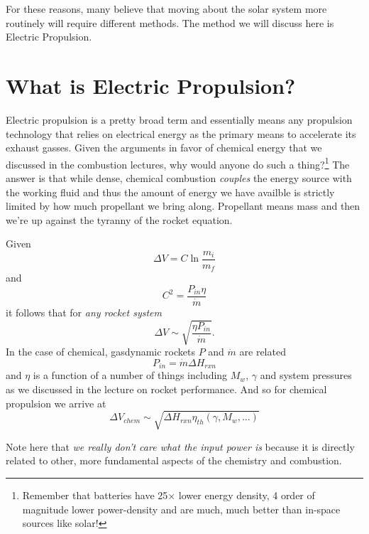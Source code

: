 \documentclass[twocolumn]{memoir} %
\begin{document}
For these reasons, many believe that moving about the solar system more routinely will require
different methods.  The method we will discuss here is Electric Propulsion.

\section{What is Electric Propulsion?}
Electric propulsion is a pretty broad term and essentially means any propulsion technology that
relies on electrical energy as the primary means to accelerate its exhaust gasses.  Given the
arguments in favor of chemical energy that we discussed in the combustion lectures, why would
anyone do such a thing?\footnote{Remember that batteries have 25$\times$ lower energy density,
4 order of magnitude lower power-density and are much, much better than in-space sources
like solar!}  The answer is that while dense, chemical combustion \emph{couples} the energy
source with the working fluid and thus the amount of energy we have availble is strictly
limited by how much propellant we bring along.  Propellant means mass and then we're up against
the tyranny of the rocket equation.  

Given
\begin{equation*}
    \Delta V = C \ln\frac{m_i}{m_f}
\end{equation*}
%
and
\begin{equation*}
    C^2 = \frac{P_{in}\eta}{\dot{m}}
\end{equation*}
%
it follows that for \emph{any rocket system}
%
\begin{equation}
    \Delta V \sim \sqrt{\frac{\eta P_{in}}{\dot{m}}}.
    \label{eq:delV_P_dotm}
\end{equation}
%
In the case of chemical, gasdynamic rockets $P$ and $\dot{m}$ are related
%
\begin{equation*}
    P_{in} = \dot{m}\Delta H_{rxn}
\end{equation*}
%
and $\eta$ is a function of a number of things including $M_w$, $\gamma$ and system pressures
as we discussed in the lecture on rocket performance.  And so for chemical propulsion we arrive at
\begin{equation}
    \Delta V_{chem} \sim \sqrt{\Delta H_{rxn} \eta_{th}(\gamma, M_w, \ldots)}
\end{equation}

Note here that \emph{we really don't care what the input power is} because it is directly related
to other, more fundamental aspects of the chemistry and combustion.
\end{document}
